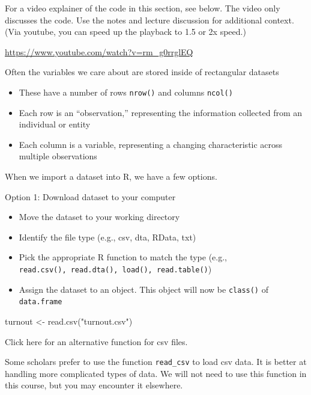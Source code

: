 \documentclass[
  letterpaper,
  DIV=11,
  numbers=noendperiod]{scrreprt}
\newenvironment{Shaded}{\begin{snugshade}}{\end{snugshade}}
\newcommand{\FunctionTok}[1]{\textcolor[rgb]{0.28,0.35,0.67}{#1}}
\newcommand{\NormalTok}[1]{\textcolor[rgb]{0.00,0.23,0.31}{#1}}
\newcommand{\OtherTok}[1]{\textcolor[rgb]{0.00,0.23,0.31}{#1}}
\newcommand{\StringTok}[1]{\textcolor[rgb]{0.13,0.47,0.30}{#1}}
\providecommand{\tightlist}{%
  \setlength{\itemsep}{0pt}\setlength{\parskip}{0pt}}\usepackage{longtable,booktabs,array}
\begin{document}
For a video explainer of the code in this section, see below. The video
only discusses the code. Use the notes and lecture discussion for
additional context. (Via youtube, you can speed up the playback to 1.5
or 2x speed.)

\url{https://www.youtube.com/watch?v=rm_g0rrglEQ}

Often the variables we care about are stored inside of rectangular
datasets

\begin{itemize}
\tightlist
\item
  These have a number of rows \texttt{nrow()} and columns
  \texttt{ncol()}
\item
  Each row is an ``observation,'' representing the information collected
  from an individual or entity
\item
  Each column is a variable, representing a changing characteristic
  across multiple observations
\end{itemize}

When we import a dataset into R, we have a few options.

Option 1: Download dataset to your computer

\begin{itemize}
\tightlist
\item
  Move the dataset to your working directory
\item
  Identify the file type (e.g., csv, dta, RData, txt)
\item
  Pick the appropriate R function to match the type (e.g.,
  \texttt{read.csv(),\ read.dta(),\ load(),\ read.table()})
\item
  Assign the dataset to an object. This object will now be
  \texttt{class()} of \texttt{data.frame}
\end{itemize}

\begin{Shaded}
\begin{Highlighting}[]
\NormalTok{turnout }\OtherTok{\textless{}{-}} \FunctionTok{read.csv}\NormalTok{(}\StringTok{"turnout.csv"}\NormalTok{)}
\end{Highlighting}
\end{Shaded}

Click here for an alternative function for csv files.

Some scholars prefer to use the function \texttt{read\_csv} to load csv
data. It is better at handling more complicated types of data. We will
not need to use this function in this course, but you may encounter it
elsewhere.
\end{document}
